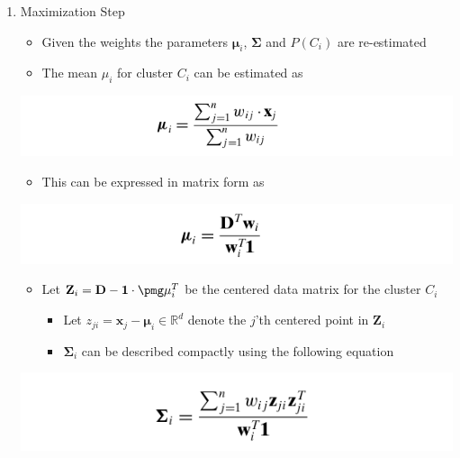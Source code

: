 \documentclass[11pt]{article}
\begin{document}
\begin{enumerate}
\item Maximization Step
\label{sec:orgada43f0}
\begin{itemize}
\item Given the weights the parameters \(\pmb \mu_i\), \(\mathbf \Sigma\) and \(P(C_i)\) are re-estimated

\item The mean \(\mu_i\) for cluster \(C_i\) can be estimated as
\end{itemize}
\begin{center}
\includegraphics[width=.9\linewidth]{Representative-based Clustering/screenshot_2018-11-27_21-15-09.png}
\end{center}
\begin{itemize}
\item This can be expressed in matrix form as
\end{itemize}
\begin{center}
\includegraphics[width=.9\linewidth]{Representative-based Clustering/screenshot_2018-11-27_21-15-37.png}
\end{center}

\begin{itemize}
\item Let \(\mathbf Z_i = \mathbf D - \mathbf 1 \cdot \pmg \mu_i ^T\) be the centered data matrix for the cluster \(C_i\)
\begin{itemize}
\item Let \(z_{ji} = \pmb x_j - \pmb \mu_i \in \mathbb R^d\) denote the \(j\)'th centered point in \(\mathbf Z_i\)
\item \(\mathbf \Sigma_i\) can be described compactly using the following equation
\end{itemize}
\end{itemize}
\begin{center}
\includegraphics[width=.9\linewidth]{Representative-based Clustering/screenshot_2018-11-27_21-18-43.png}
\end{center}


\end{enumerate}
\end{document}
